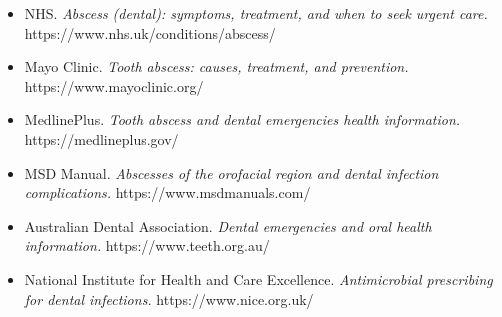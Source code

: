 \begin{itemize}
    \item NHS. \textit{Abscess (dental): symptoms, treatment, and when to seek urgent care.} https://www.nhs.uk/conditions/abscess/
    \item Mayo Clinic. \textit{Tooth abscess: causes, treatment, and prevention.} https://www.mayoclinic.org/
    \item MedlinePlus. \textit{Tooth abscess and dental emergencies health information.} https://medlineplus.gov/
    \item MSD Manual. \textit{Abscesses of the orofacial region and dental infection complications.} https://www.msdmanuals.com/
    \item Australian Dental Association. \textit{Dental emergencies and oral health information.} https://www.teeth.org.au/
    \item National Institute for Health and Care Excellence. \textit{Antimicrobial prescribing for dental infections.} https://www.nice.org.uk/
\end{itemize}
